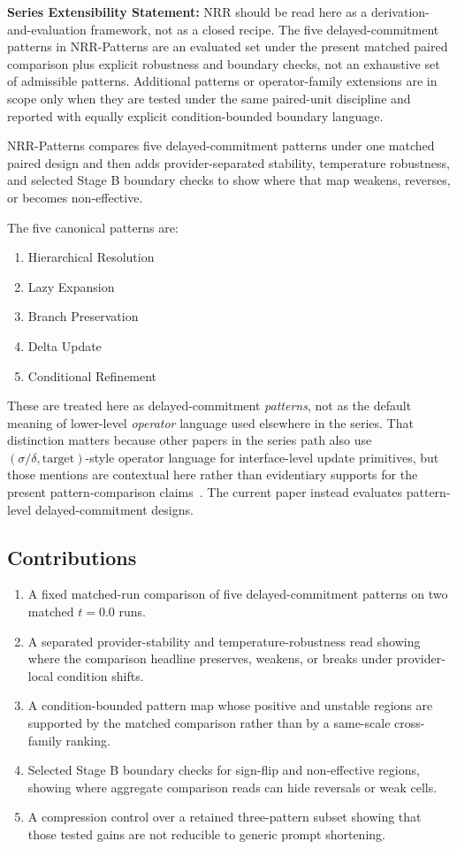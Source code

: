 \documentclass[11pt,a4paper]{article}
\begin{document}
\textbf{Series Extensibility Statement:}
NRR should be read here as a derivation-and-evaluation framework, not as a closed recipe. The five delayed-commitment patterns in NRR-Patterns are an evaluated set under the present matched paired comparison plus explicit robustness and boundary checks, not an exhaustive set of admissible patterns. Additional patterns or operator-family extensions are in scope only when they are tested under the same paired-unit discipline and reported with equally explicit condition-bounded boundary language.

NRR-Patterns compares five delayed-commitment patterns under one matched paired
design and then adds provider-separated stability, temperature robustness, and
selected Stage B boundary checks to show where that map weakens, reverses, or
becomes non-effective.

The five canonical patterns are:
\begin{enumerate}
  \item Hierarchical Resolution
  \item Lazy Expansion
  \item Branch Preservation
  \item Delta Update
  \item Conditional Refinement
\end{enumerate}

These are treated here as delayed-commitment \emph{patterns}, not as the default meaning of lower-level \emph{operator} language used elsewhere in the series. That distinction matters because other papers in the series path also use \((\sigma/\delta,\text{target})\)-style operator language for interface-level update primitives, but those mentions are contextual here rather than evidentiary supports for the present pattern-comparison claims~\cite{saito2026phi,saito2026transfer,saito2026coupled}. The current paper instead evaluates pattern-level delayed-commitment designs.

\subsection{Contributions}

\begin{enumerate}
  \item A fixed matched-run comparison of five delayed-commitment patterns on two matched \(t=0.0\) runs.
  \item A separated provider-stability and temperature-robustness read showing where the comparison headline preserves, weakens, or breaks under provider-local condition shifts.
  \item A condition-bounded pattern map whose positive and unstable regions are supported by the matched comparison rather than by a same-scale cross-family ranking.
  \item Selected Stage B boundary checks for sign-flip and non-effective regions, showing where aggregate comparison reads can hide reversals or weak cells.
  \item A compression control over a retained three-pattern subset showing that those tested gains are not reducible to generic prompt shortening.
\end{enumerate}
\end{document}
